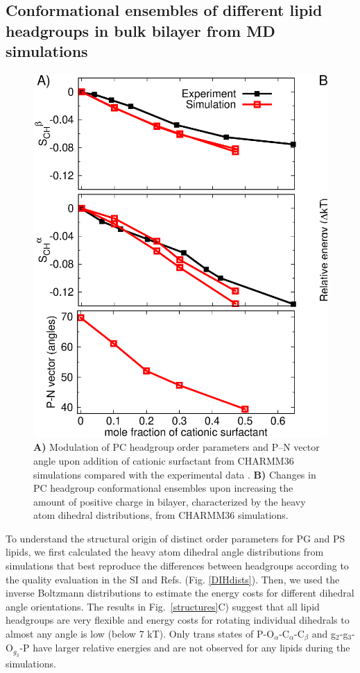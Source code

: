 \documentclass[aps,prl,superscriptaddress,twocolumn]{revtex4}
\begin{document}
\subsection{Conformational ensembles of different lipid headgroups in bulk bilayer from MD simulations}

\begin{figure}[bt]
  \centering
  \includegraphics[width=18.0cm]{./Figs/HGorderparametersPCvsSURFchangeDIHEDRALSlog.eps}
  \caption{\label{changesWITHsurf}
    \textbf{A)} Modulation of PC headgroup order parameters and P--N vector angle upon addition of cationic surfactant
    from CHARMM36 simulations compared with the experimental data \cite{scherer89}.
    \textbf{B)} Changes in PC headgroup conformational ensembles upon increasing the amount of positive charge in bilayer,
    characterized by the heavy atom dihedral distributions, from CHARMM36 simulations.
  }
\end{figure}

To understand the structural origin of distinct order parameters for PG and PS lipids,
we first calculated the heavy atom dihedral angle distributions from simulations
that best reproduce the differences between headgroups according to the quality
evaluation in the SI and Refs. \cite{botan15,antila19} (Fig. \ref{DIHdists}).
Then, we used the inverse Boltzmann distributions to estimate the
energy costs for different dihedral angle orientations.
The results in Fig.~\ref{structures}C) suggest that all lipid headgroups are very flexible and
energy costs for rotating individual dihedrals to almost any angle is low (below 7 kT).
Only trans states of P-O$_\alpha$-C$_\alpha$-C$_\beta$ and g$_2$-g$_3$-O$_{g_3}$-P have larger relative
energies and are not observed for any lipids during the simulations.
\end{document}
